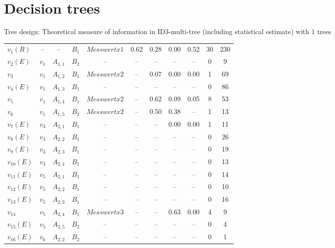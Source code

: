 \clearpage
\section{Decision trees}
Tree design: Theoretical measure of information in
ID3-multi-tree (including statistical estimate) with 1 trees



\begin{footnotesize}
\begin{center}
\tablelasttail{\hline} 
\begin{supertabular}{|lcccccccccc}
$v_{1} (R) $ & -- & -- & $B_{1}$ & $Messwert x1         $ & 0.62 & 0.28 & 0.00 & 0.52 &30 & 230  \tabularnewline
 $v_{2} (E)$ & $v_{1}$ & $A_{1,1}$ & $B_{2}$&  -- &  -- &  -- &  -- &  -- &0 & 9  \tabularnewline
 $v_{3}    $ & $v_{1}$ & $A_{1,2}$ & $B_{1}$& $Messwert x2         $ &  -- & 0.07 & 0.00 & 0.00 &1 & 69  \tabularnewline
 $v_{4} (E)$ & $v_{1}$ & $A_{1,3}$ & $B_{1}$&  -- &  -- &  -- &  -- &  -- &0 & 86  \tabularnewline
 $v_{5}    $ & $v_{1}$ & $A_{1,4}$ & $B_{1}$& $Messwert x2         $ &  -- & 0.62 & 0.09 & 0.05 &8 & 53  \tabularnewline
 $v_{6}    $ & $v_{1}$ & $A_{1,5}$ & $B_{2}$& $Messwert x2         $ &  -- & 0.50 & 0.38 &  -- &1 & 13  \tabularnewline
 $v_{7} (E)$ & $v_{3}$ & $A_{2,1}$ & $B_{1}$&  -- &  -- &  -- & 0.00 & 0.00 &1 & 11  \tabularnewline
 $v_{8} (E)$ & $v_{3}$ & $A_{2,2}$ & $B_{1}$&  -- &  -- &  -- &  -- &  -- &0 & 26  \tabularnewline
 $v_{9} (E)$ & $v_{3}$ & $A_{2,3}$ & $B_{1}$&  -- &  -- &  -- &  -- &  -- &0 & 19  \tabularnewline
 $v_{10} (E)$ & $v_{3}$ & $A_{2,4}$ & $B_{1}$&  -- &  -- &  -- &  -- &  -- &0 & 13  \tabularnewline
 $v_{11} (E)$ & $v_{5}$ & $A_{2,1}$ & $B_{1}$&  -- &  -- &  -- &  -- &  -- &0 & 14  \tabularnewline
 $v_{12} (E)$ & $v_{5}$ & $A_{2,2}$ & $B_{1}$&  -- &  -- &  -- &  -- &  -- &0 & 10  \tabularnewline
 $v_{13} (E)$ & $v_{5}$ & $A_{2,3}$ & $B_{1}$&  -- &  -- &  -- &  -- &  -- &0 & 16  \tabularnewline
 $v_{14}    $ & $v_{5}$ & $A_{2,4}$ & $B_{1}$& $Messwert x3         $ &  -- &  -- & 0.63 & 0.00 &4 & 9  \tabularnewline
 $v_{15} (E)$ & $v_{5}$ & $A_{2,5}$ & $B_{2}$&  -- &  -- &  -- &  -- &  -- &0 & 4  \tabularnewline
 $v_{16} (E)$ & $v_{6}$ & $A_{2,2}$ & $B_{2}$&  -- &  -- &  -- &  -- &  -- &0 & 1  \tabularnewline

\end{supertabular}
\end{center}
\end{footnotesize}
